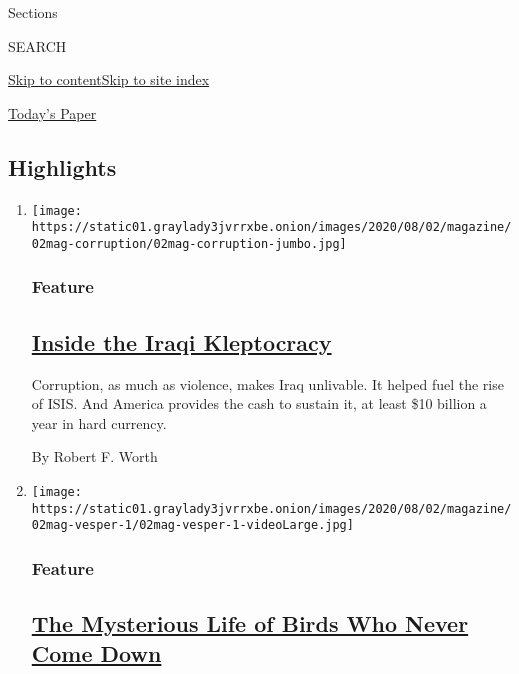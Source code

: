 Sections

SEARCH

\protect\hyperlink{site-content}{Skip to
content}\protect\hyperlink{site-index}{Skip to site index}

\href{https://myaccount.nytimes3xbfgragh.onion/auth/login?response_type=cookie\&client_id=vi}{}

\href{https://www.nytimes3xbfgragh.onion/section/todayspaper}{Today's
Paper}

\hypertarget{highlights}{%
\subsection{Highlights}\label{highlights}}

\begin{enumerate}
\def\labelenumi{\arabic{enumi}.}
\item
  \texttt{[image: https://static01.graylady3jvrrxbe.onion/images/2020/08/02/magazine/02mag-corruption/02mag-corruption-jumbo.jpg]}

  \hypertarget{feature}{%
  \subsubsection{Feature}\label{feature}}

  \hypertarget{inside-the-iraqi-kleptocracy}{%
  \subsection{\texorpdfstring{\href{/2020/07/29/magazine/iraq-corruption.html}{Inside
  the Iraqi
  Kleptocracy}}{Inside the Iraqi Kleptocracy}}\label{inside-the-iraqi-kleptocracy}}

  Corruption, as much as violence, makes Iraq unlivable. It helped fuel
  the rise of ISIS. And America provides the cash to sustain it, at
  least \$10 billion a year in hard currency.

  By Robert F. Worth
\item
  \texttt{[image: https://static01.graylady3jvrrxbe.onion/images/2020/08/02/magazine/02mag-vesper-1/02mag-vesper-1-videoLarge.jpg]}

  \hypertarget{feature-1}{%
  \subsubsection{Feature}\label{feature-1}}

  \hypertarget{the-mysterious-life-of-birds-who-never-come-down}{%
  \subsection{\texorpdfstring{\href{/2020/07/29/magazine/vesper-flights.html}{The
  Mysterious Life of Birds Who Never Come
  Down}}{The Mysterious Life of Birds Who Never Come Down}}\label{the-mysterious-life-of-birds-who-never-come-down}}


\end{enumerate}
